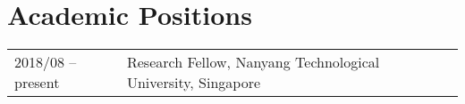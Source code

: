 \section*{Academic Positions}
\begin{tabular}{p{} p{}}
2018/08 -- present & Research Fellow, Nanyang Technological University, Singapore \\
\end{tabular}
